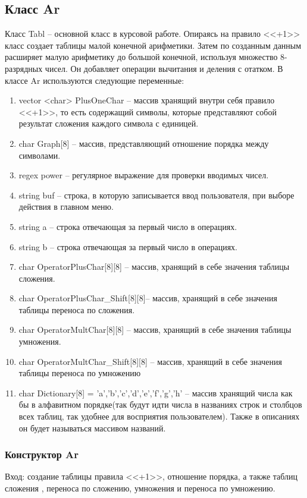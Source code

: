 \documentclass[10pt,a4paper,final]{article} %
\begin{document}
	\subsection{Класс Ar}
	Класс Tabl -- основной класс в курсовой работе. Опираясь на правило <<+1>> класс создает таблицы малой конечной арифметики. Затем по созданным данным расширяет малую арифметику до большой конечной, используя множество 8-разрядных чисел. Он добавляет операции вычитания и деления с отатком.  
	В классе Ar используются следующие переменные:
	\begin{enumerate}[itemsep=0pt,parsep=0pt,topsep=0pt,partopsep=0pt]
		\item vector <char> PlusOneChar -- массив хранящий внутри себя правило <<+1>>, то есть содержащий символы, которые представляют собой результат сложения каждого символа с единицей.
		\item char Graph[8] -- массив, представляющий отношение порядка между символами.
		\item regex power -- регулярное выражение для проверки вводимых чисел.
		\item string buf -- строка, в которую записывается ввод пользователя, при выборе действия в главном меню.
		\item string a -- строка отвечающая за первый число в операциях.
		\item string b -- строка отвечающая за первый число в операциях.
		\item char OperatorPlusChar[8][8] -- массив, хранящий в себе значения таблицы сложения.
		\item char OperatorPlusChar\_Shift[8][8]-- массив, хранящий в себе значения таблицы переноса по сложения.
		\item char OperatorMultChar[8][8] -- массив, хранящий в себе значения таблицы умножения.
		\item char OperatorMultChar\_Shift[8][8] -- массив, хранящий в себе значения таблицы переноса по умножению
		\item char Dictionary[8] = { 'a','b','c','d','e','f','g','h' } -- массив хранящий числа как бы в алфавитном порядке(так будут идти числа в названиях строк и столбцов всех таблиц, так удобнее для восприятия пользователем). Также в описаниях он будет называться массивом названий.
	\end{enumerate}
	
	\subsubsection{Конструктор Ar}
	Вход: создание таблицы правила <<+1>>, отношение порядка, а также таблиц сложения , переноса по сложению, умножения и переноса по умножению.
	
\end{document}
